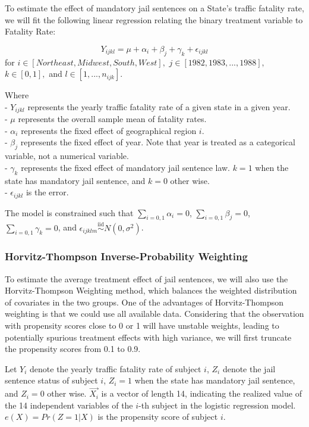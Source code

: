 \documentclass[]{article}
\begin{document}
To estimate the effect of mandatory jail sentences on a State's traffic fatality rate, we will fit the following linear regression relating the binary treatment variable to Fatality Rate:

\[
Y_{ijkl} = \mu + \alpha_i + \beta_j  + \gamma_k + \epsilon_{ijkl}
\]
for \(i \in [Northeast, Midwest, South, West],\) \(j \in [1982, 1983, ..., 1988],\) \(k \in [0, 1],\) and \(l \in [1, ..., n_{ijk}]\).

Where\\
- \(Y_{ijkl}\) represents the yearly traffic fatality rate of a given state in a given year.\\
- \(\mu\) represents the overall sample mean of fatality rates.\\
- \(\alpha_i\) represents the fixed effect of geographical region \(i\).\\
- \(\beta_j\) represents the fixed effect of year. Note that year is treated as a categorical variable, not a numerical variable.\\
- \(\gamma_k\) represents the fixed effect of mandatory jail sentence law. \(k = 1\) when the state has mandatory jail sentence, and \(k = 0\) other wise.\\
- \(\epsilon_{ijkl}\) is the error.

The model is constrained such that \(\displaystyle\sum\limits_{i = 0, 1}\alpha_i = 0\), \(\displaystyle\sum\limits_{i = 0, 1}\beta_j = 0\), \(\displaystyle\sum\limits_{i = 0, 1}\gamma_k = 0\), and \(\epsilon_{ijklm} \overset{\text{iid}}\sim N(0, \sigma^2)\).

\hypertarget{horvitz-thompson-inverse-probability-weighting}{%
\subsubsection{Horvitz-Thompson Inverse-Probability Weighting}\label{horvitz-thompson-inverse-probability-weighting}}

To estimate the average treatment effect of jail sentences, we will also use the Horvitz-Thompson Weighting method, which balances the weighted distribution of covariates in the two groups. One of the advantages of Horvitz-Thompson weighting is that we could use all available data. Considering that the observation with propensity scores close to 0 or 1 will have unstable weights, leading to potentially spurious treatment effects with high variance, we will first truncate the propensity scores from 0.1 to 0.9.

Let \(Y_i\) denote the yearly traffic fatality rate of subject \(i\), \(Z_i\) denote the jail sentence status of subject \(i\), \(Z_i = 1\) when the state has mandatory jail sentence, and \(Z_i = 0\) other wise. \(\overrightarrow{X_i}\) is a vector of length 14, indicating the realized value of the 14 independent variables of the \(i\)-th subject in the logistic regression model. \(e(X) = Pr(Z = 1 | X)\) is the propensity score of subject \(i\).
\end{document}
